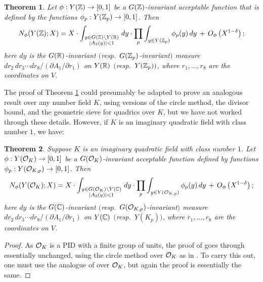 \documentclass[11pt,a4paper]{amsart}
\def\Z{{\rm \mathbb{Z}}}
\def\C{{\rm \mathbb{C}}}
\def\R{{\rm \mathbb{R}}}
\def\O{{\rm \mathcal{O}}}
\numberwithin{equation}{section}
\newtheorem{theorem}{Theorem}[section]
\begin{document}
\begin{theorem}\label{thm: counting in the quadric over Q}
  Let $\phi:Y(\Z)\to[0,1]$ be a $G(\Z)$-invariant acceptable function that is defined by the functions $\phi_{p}:Y({\Z_p})\to[0,1]$. Then  
\begin{equation}
N_\phi(Y(\Z);X)
  = 
  X  \cdot 
 \int_{\scriptstyle{y\in G(\Z) \backslash Y(\R)}\atop\scriptstyle{|A_3(y)|<1}}
dy \cdot \prod_{p}
  \int_{y\in Y({\Z_{p}})}\phi_{p}(y)\,dy\,+\,O_\phi\left(X^{1 - \delta}\right);
\end{equation}
  here $dy$ is the $G(\R)$-invariant $($resp.\ $G(\Z_p)$-invariant$)$ measure $dr_2\,dr_3\cdots dr_8/(\partial A_1/\partial r_1)$ on $Y(\R)$ $($resp.\ $Y(\Z_p))$,
  where $r_1,\ldots,r_8$ are the coordinates on $V$.
\end{theorem}\noindent



The proof of Theorem \ref{thm: counting in the quadric over Q} could presumably be adapted to prove an analogous result over any number field $K$, using versions of the circle method, the divisor bound, and the geometric sieve for quadrics over $K$, but we have not worked through these details. However, if $K$ is an imaginary quadratic field with class number $1$, we have:

\begin{theorem}\label{thm: counting in the quadric over imaginary quadratic}
  Suppose $K$ is an imaginary quadratic field with class number $1$. Let $\phi:Y(\O_K)\to[0,1]$ be a $G(\O_K)$-invariant acceptable function defined by functions $\phi_{p}:Y({\O_{K,p}})\to[0,1]$. Then  
\begin{equation}
N_\phi(Y(\O_K);X)
  = 
  X  \cdot 
 \int_{\scriptstyle{y\in G(\O_K) \backslash Y(\C)}\atop\scriptstyle{|A_3(y)|<1}}
dy \cdot \prod_{p}
  \int_{y\in Y({\O_{K,p}})}\phi_{p}(y)\,dy\,+\,O_\phi\left(X^{1 - \delta}\right);
\end{equation}
  here $dy$ is the $G(\C)$-invariant $($resp.\ $G(\O_{K,p})$-invariant$)$ measure $dr_2\,dr_3\cdots dr_8/(\partial A_1/\partial r_1)$ on $Y(\C)$ $($resp.\ $Y(K_p))$,
  where $r_1,\ldots,r_8$ are the coordinates on $V$.
\end{theorem}
\begin{proof}
As $\O_K$ is a PID with a finite group of units, the proof of \cite[Theorem 4.1]{AlpogeBhargavaShnidman} goes through essentially unchanged, using the circle method over $\O_K$ as in \cite{Browningcubicforms}. To carry this out, one must use the analogue of \cite[Theorem 1.1]{BrowningHeathBrown} over $\O_K$, but again the proof is essentially the same.      
\end{proof}
\end{document}
